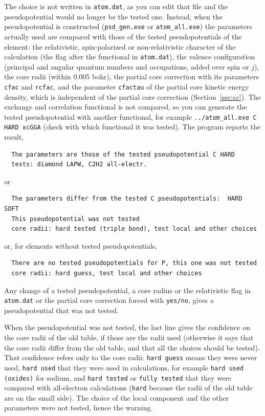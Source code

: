 \documentclass[11pt]{article}
\begin{document}
The choice is not written in \texttt{atom.dat}, as you can edit that file
and the pseudopotential would no longer be the tested one.
Instead, when the pseudopotential is constructed (\texttt{psd\_gen.exe}
or \texttt{atom\_all.exe}) the parameters actually used are compared with those
of the tested pseudopotentials of the element:
the relativistic, spin-polarized or non-relativistic character of the calculation
(the flag after the functional in \texttt{atom.dat}),
the valence configuration (principal and angular quantum numbers and occupations,
added over spin or $j$),
the core radii (within 0.005 bohr), the partial core correction with its
parameters \texttt{cfac} and \texttt{rcfac}, and the parameter \texttt{cfactau}
of the partial core kinetic energy density, which is independent of the partial
core correction (Section~\ref{sec:cc}).
The exchange and correlation functional is not compared, so you can generate the tested
pseudopotential with another functional, for example \texttt{../atom\_all.exe C HARD xcGGA}
(check with which functional it was tested).
The program reports the result,
\begin{verbatim}
  The parameters are those of the tested pseudopotential C HARD
  tests: diamond LAPW, C2H2 all-electr.
\end{verbatim}
or
\begin{verbatim}
  The parameters differ from the tested C pseudopotentials:  HARD  SOFT
  This pseudopotential was not tested
  core radii: hard tested (triple bond), test local and other choices
\end{verbatim}
or, for elements without tested pseudopotentials,
\begin{verbatim}
  There are no tested pseudopotentials for P, this one was not tested
  core radii: hard guess, test local and other choices
\end{verbatim}
Any change of a tested pseudopotential, a core radius or the relativistic flag in
\texttt{atom.dat} or the
partial core correction forced with \texttt{yes/no}, gives a pseudopotential that was not tested.

When the pseudopotential was not tested, the last line gives the confidence on the
core radii of the old table, if those are the radii used (otherwise it says that the
core radii differ from the old table, and that all the choices should be tested).
That confidence refers only to the core radii: \texttt{hard guess} means they were
never used, \texttt{hard used} that they were used in calculations,
for example \texttt{hard used (oxides)} for sodium,
and \texttt{hard tested} or \texttt{fully tested} that they were compared with
all-electron calculations
(\texttt{hard} because the radii of the old table are on the small side).
The choice of the local component and the other parameters were not tested,
hence the warning.
\end{document}
